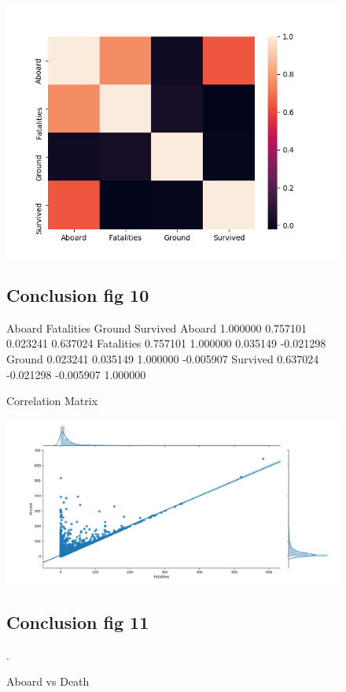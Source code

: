 \documentclass{article}
\begin{document}
\begin{figure}[!hbt]
\includegraphics[width=1.3\linewidth,height=0.500\textheight]{Cov_Matrix.png}
\caption{Correlation Matrix}
\label{fig10:}
\subsection{Conclusion fig 10}
               Aboard  Fatalities    Ground  Survived
Aboard      1.000000    0.757101  0.023241  0.637024
Fatalities  0.757101    1.000000  0.035149 -0.021298
Ground      0.023241    0.035149  1.000000 -0.005907
Survived    0.637024   -0.021298 -0.005907  1.000000


\end{figure}





\begin{figure}[!hbt]
\includegraphics[width=1.3\linewidth,height=0.500\textheight]{covAboard,Death.png}
\caption{Aboard vs Death }
\label{fig11:}
\subsection{Conclusion fig 11}
.
\end{figure}
\end{document}
